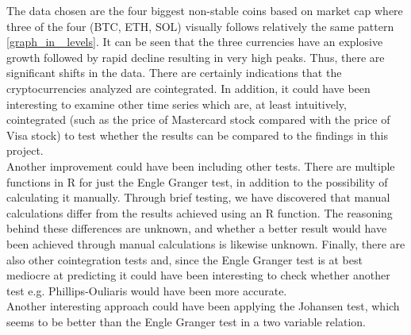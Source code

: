 \noindent The data chosen are the four biggest non-stable coins based on market cap where three of the four (BTC, ETH, SOL) visually follows relatively the same pattern \ref{graph_in _levels}. It can be seen that the three currencies have an explosive growth followed by rapid decline resulting in very high peaks. Thus, there are significant shifts in the data. There are certainly indications that the cryptocurrencies analyzed are cointegrated. In addition, it could have been interesting to examine other time series which are, at least intuitively, cointegrated (such as the price of Mastercard stock compared with the price of Visa stock) to test whether the results can be compared to the findings in this project.\\

\noindent Another improvement could have been including other tests. There are multiple functions in R for just the Engle Granger test, in addition to the possibility of calculating it manually. Through brief testing, we have discovered that manual calculations differ from the results achieved using an R function. The reasoning behind these differences are unknown, and whether a better result would have been achieved through manual calculations is likewise unknown. Finally, there are also other cointegration tests and, since the Engle Granger test is at best mediocre at predicting it could have been interesting to check whether another test e.g. Phillips-Ouliaris would have been more accurate.\\

\noindent Another interesting approach could have been applying the Johansen test, which seems to be better than the Engle Granger test in a two variable relation.

